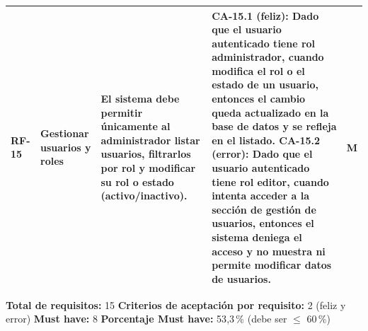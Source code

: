 \begin{longtable}{|>{\bfseries}p{1.2cm}|p{2.3cm}|p{3.4cm}|p{5.9cm}|>{\centering\arraybackslash}p{1.1cm}|}
RF-15 & Gestionar usuarios y roles & El sistema debe permitir únicamente al administrador listar usuarios, filtrarlos por rol y modificar su rol o estado (activo/inactivo). &
\textbf{CA-15.1 (feliz):} Dado que el usuario autenticado tiene rol administrador, cuando modifica el rol o el estado de un usuario, entonces el cambio queda actualizado en la base de datos y se refleja en el listado.
\newline
\textbf{CA-15.2 (error):} Dado que el usuario autenticado tiene rol editor, cuando intenta acceder a la sección de gestión de usuarios, entonces el sistema deniega el acceso y no muestra ni permite modificar datos de usuarios. & M \\ \hline

\end{longtable}
\endgroup

\bigskip
\noindent
\textbf{Total de requisitos:} 15 \quad\textbf{Criterios de aceptación por requisito:} 2 (feliz y error) \quad\textbf{Must have:} 8 \quad\textbf{Porcentaje Must have:} 53{,}3\,\% (debe ser $\leq$ 60\,\%)
